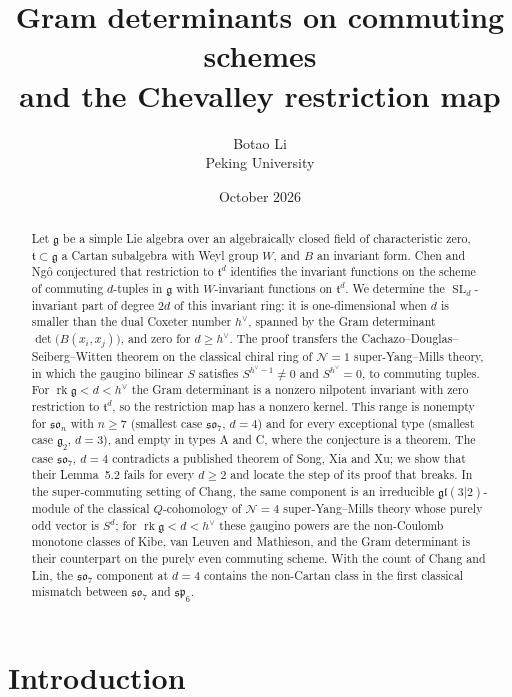 \documentclass[11pt]{article}
\title{Gram determinants on commuting schemes\\ and the Chevalley restriction map}
\author{Botao Li\\[4pt]
{\normalsize Peking University}}
\date{October 2026}
\theoremstyle{definition}
\newcommand{\g}{\mathfrak g}
\newcommand{\h}{\mathfrak t}
\newcommand{\rk}{\operatorname{rk}}
\newcommand{\hv}{h^\vee}
\DeclareMathOperator{\SL}{SL}
\begin{document}
\maketitle

\begin{abstract}
Let $\g$ be a simple Lie algebra over an algebraically closed field of characteristic zero, $\h\subset\g$ a Cartan subalgebra with Weyl group $W$, and $B$ an invariant form. Chen and Ng\^o conjectured that restriction to $\h^d$ identifies the invariant functions on the scheme of commuting $d$-tuples in $\g$ with $W$-invariant functions on $\h^d$. We determine the $\SL_d$-invariant part of degree $2d$ of this invariant ring: it is one-dimensional when $d$ is smaller than the dual Coxeter number $\hv$, spanned by the Gram determinant $\det\bigl(B(x_i,x_j)\bigr)$, and zero for $d\ge\hv$. The proof transfers the Cachazo--Douglas--Seiberg--Witten theorem on the classical chiral ring of $\mathcal N=1$ super-Yang--Mills theory, in which the gaugino bilinear $S$ satisfies $S^{\hv-1}\neq0$ and $S^{\hv}=0$, to commuting tuples. For $\rk\g<d<\hv$ the Gram determinant is a nonzero nilpotent invariant with zero restriction to $\h^d$, so the restriction map has a nonzero kernel. This range is nonempty for $\mathfrak{so}_n$ with $n\ge7$ (smallest case $\mathfrak{so}_7$, $d=4$) and for every exceptional type (smallest case $\g_2$, $d=3$), and empty in types A and C, where the conjecture is a theorem. The case $\mathfrak{so}_7$, $d=4$ contradicts a published theorem of Song, Xia and Xu; we show that their Lemma~5.2 fails for every $d\ge2$ and locate the step of its proof that breaks. In the super-commuting setting of Chang, the same component is an irreducible $\mathfrak{gl}(3|2)$-module of the classical $Q$-cohomology of $\mathcal N=4$ super-Yang--Mills theory whose purely odd vector is $S^d$; for $\rk\g<d<\hv$ these gaugino powers are the non-Coulomb monotone classes of Kibe, van Leuven and Mathieson, and the Gram determinant is their counterpart on the purely even commuting scheme. With the count of Chang and Lin, the $\mathfrak{so}_7$ component at $d=4$ contains the non-Cartan class in the first classical mismatch between $\mathfrak{so}_7$ and $\mathfrak{sp}_6$.
\end{abstract}

\section{Introduction}
\end{document}
